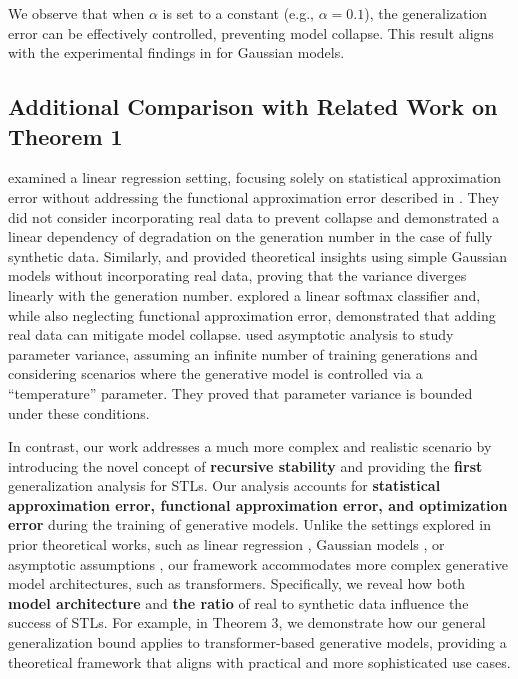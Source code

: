 We observe that when \(\alpha\) is set to a constant (e.g., \(\alpha = 0.1\)), the generalization error can be effectively controlled, preventing model collapse. This result aligns with the experimental findings in \cite{alemohammadself} for Gaussian models.




\subsection{Additional Comparison with Related Work on Theorem 1}

\cite{dohmatob2024model} examined a linear regression setting, focusing solely on statistical approximation error without addressing the functional approximation error described in \cite{shumailov2024ai}. They did not consider incorporating real data to prevent collapse and demonstrated a linear dependency of degradation on the generation number in the case of fully synthetic data. Similarly, \cite{alemohammadself} and \cite{shumailov2024ai} provided theoretical insights using simple Gaussian models without incorporating real data, proving that the variance diverges linearly with the generation number. \cite{seddik2024bad} explored a linear softmax classifier and, while also neglecting functional approximation error, demonstrated that adding real data can mitigate model collapse. \cite{marchi2024heat} used asymptotic analysis to study parameter variance, assuming an infinite number of training generations and considering scenarios where the generative model is controlled via a ``temperature'' parameter. They proved that parameter variance is bounded under these conditions.  



In contrast, our work addresses a much more complex and realistic scenario by introducing the novel concept of \textbf{recursive stability} and providing the \textbf{first} generalization analysis for STLs. Our analysis accounts for \textbf{statistical approximation error, functional approximation error, and optimization error} during the training of generative models. Unlike the settings explored in prior theoretical works, such as linear regression \citep{dohmatob2024model,gerstgrasser2024is}, Gaussian models \citep{alemohammadself, shumailov2024ai}, or asymptotic assumptions \citep{marchi2024heat}, our framework accommodates more complex generative model architectures, such as transformers. Specifically, we reveal how both \textbf{model architecture} and \textbf{the ratio} of real to synthetic data influence the success of STLs. For example, in Theorem 3, we demonstrate how our general generalization bound applies to transformer-based generative models, providing a theoretical framework that aligns with practical and more sophisticated use cases. 



